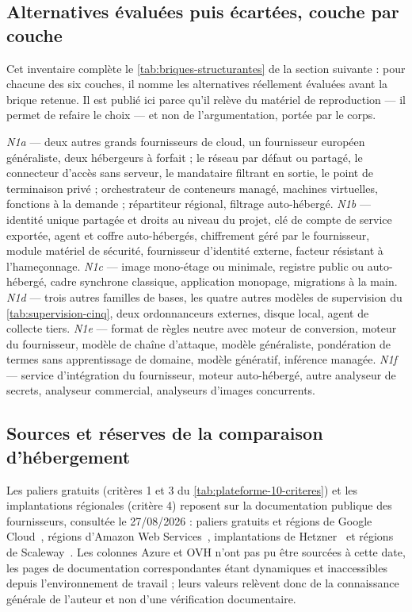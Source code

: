 \subsection{Alternatives évaluées puis écartées, couche par couche}
\label{ann:alternatives-couches}

Cet inventaire complète le \cref{tab:briques-structurantes} de la section suivante : pour chacune des six couches, il
nomme les alternatives réellement évaluées avant la brique retenue. Il est publié ici parce qu'il
relève du matériel de reproduction --- il permet de refaire le choix --- et non de
l'argumentation, portée par le corps.

{\small\noindent
\emph{N1a} --- deux autres grands fournisseurs de cloud, un fournisseur européen généraliste,
deux hébergeurs à forfait ; le réseau par défaut ou partagé, le connecteur d'accès sans serveur,
le mandataire filtrant en sortie, le point de terminaison privé ; orchestrateur de conteneurs
managé, machines virtuelles, fonctions à la demande ; répartiteur régional, filtrage
auto-hébergé. \emph{N1b} --- identité unique partagée et droits au niveau du projet, clé de
compte de service exportée, agent et coffre auto-hébergés, chiffrement géré par le fournisseur,
module matériel de sécurité, fournisseur d'identité externe, facteur résistant à l'hameçonnage.
\emph{N1c} --- image mono-étage ou minimale, registre public ou auto-hébergé, cadre synchrone
classique, application monopage, migrations à la main. \emph{N1d} --- trois autres familles de
bases, les quatre autres modèles de supervision du \cref{tab:supervision-cinq}, deux ordonnanceurs
externes, disque local, agent de collecte tiers. \emph{N1e} --- format de règles neutre avec
moteur de conversion, moteur du fournisseur, modèle de chaîne d'attaque, modèle généraliste,
pondération de termes sans apprentissage de domaine, modèle génératif, inférence managée.
\emph{N1f} --- service d'intégration du fournisseur, moteur auto-hébergé, autre analyseur de
secrets, analyseur commercial, analyseurs d'images concurrents.\par}

\subsection{Sources et réserves de la comparaison d'hébergement}
\label{ann:etudes-comparatives-plateforme}

Les paliers gratuits (critères 1 et 3 du \cref{tab:plateforme-10-criteres}) et les implantations
régionales (critère 4) reposent sur la documentation publique des fournisseurs, consultée le
27/08/2026 : paliers gratuits et régions de Google
Cloud~\cite{gcp_free_tier,gcp_regions_zones}, régions d'Amazon Web Services~\cite{aws_regions},
implantations de Hetzner~\cite{hetzner_locations} et régions de Scaleway~\cite{scaleway_regions}.
Les colonnes \og{}Azure\fg{} et \og{}OVH\fg{} n'ont pas pu être sourcées à cette date, les pages de
documentation correspondantes étant dynamiques et inaccessibles depuis l'environnement de travail ;
leurs valeurs relèvent donc de la connaissance générale de l'auteur et non d'une vérification
documentaire.

